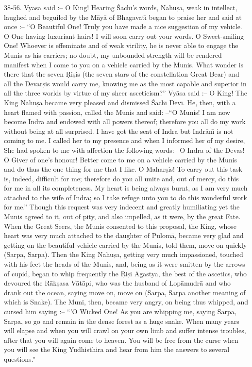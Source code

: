 38-56. Vyasa said :-- O King! Hearing \'Sach\={\i}'s words, Nahu\d{s}a, weak in intellect, laughed and beguiled by the M\=ay\=a of Bhagavat\={\i} began to praise her and said at once :-- ``O Beautiful One! Truly you have made a nice suggestion of my vehicle. O One having luxuriant hairs! I will soon carry out your words. O Sweet-smiling One! Whoever is effeminate and of weak virility, he is never able to engage the Munis as his carriers; no doubt, my unbounded strength will be rendered manifest when I come to you on a vehicle carried by the Munis. What wonder is there that the seven \d{R}i\d{s}is (the seven stars of the constellation Great Bear) and all the Devar\d{s}is would carry me, knowing me as the most capable and superior in all the three worlds by virtue of my sheer asceticism?'' Vy\=asa said :-- O King! The King Nahu\d{s}a became very pleased and dismissed \'Sach\={\i} Dev\={\i}. He, then, with a heart flamed with passion, called the Munis and said: --``O Munis! I am now become Indra and endowed with all powers thereof; therefore you all do my work without being at all surprised. I have got the seat of Indra but Indr\=an\={\i} is not coming to me. I called her to my presence and when I informed her of my desire, She had spoken to me with affection the following words:-- O Indra of the Devas! O Giver of one's honour! Better come to me on a vehicle carried by the Munis and do thus the one thing for me that I like. O Mahar\d{s}is! To carry out this task is, indeed, difficult for me; therefore do you all unite and, out of mercy, do this for me in all its completeness. My heart is being always burnt, as I am very much attached to the wife of Indra; so I take refuge unto you to do this wonderful work for me.'' Though this request was very indecent and greatly humiliating yet the Munis agreed to it, out of pity, and also impelled, as it were, by the great Fate. When the Great Seers, the Munis consented to this proposal, the King, whose heart was very much attached to the daughter of Pulom\=a, became very glad and getting on the beautiful vehicle carried by the Munis, told them, move on quickly (Sarpa, Sarpa). Then the King Nahu\d{s}a, getting very much impassioned, touched with his feet the heads of the Munis, and, being as it were smitten by the arrows of cupid, began to whip frequently the \d{R}i\d{s}i Agastya, the best of the ascetics, who devoured the R\=ak\d{s}asa V\=at\=api, who was the husband of Lop\=amudr\=a and who drank out the ocean, saying move on, move on (Sarpa, Sarpa another meaning of which is Snake). The Muni, then, became very angry, on being thus whipped, and cursed him saying :-- ``'O Wicked One! As you are whipping me, saying Sarpa, Sarpa, so go and remain in the dense forest as a huge snake. When many years will elapse and when you will crawl on your own limb and suffer intense troubles, after that you will again come to heaven. You will be free from the curse when you will see the King Yudhisthira and hear from him the answers to several questions.''

